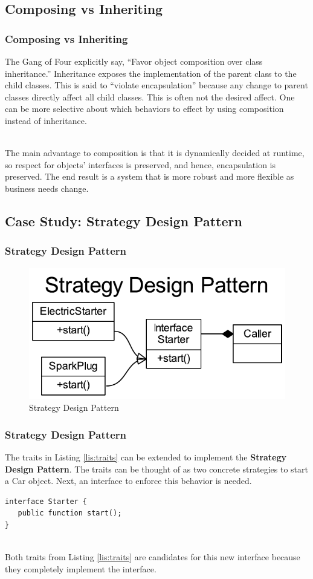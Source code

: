 \documentclass[aspectratio=169]{beamer}
\begin{document}
\subsection{Composing vs Inheriting}
\begin{frame}
\frametitle{Composing vs Inheriting}
The Gang of Four explicitly say, ``Favor object composition over class inheritance.'' \cite{gangoffour} Inheritance exposes the implementation of the parent class to the child classes. This is said to ``violate encapsulation'' because any change to parent classes directly affect all child classes. This is often not the desired affect. One can be more selective about which behaviors to effect by using composition instead of inheritance.

\mbox{}\\
The main advantage to composition is that it is dynamically decided at runtime, so respect for objects' interfaces is preserved, and hence, encapsulation is preserved. The end result is a system that is more robust and more flexible as business needs change.
\end{frame}

\subsection{Case Study: Strategy Design Pattern}
\begin{frame}
\frametitle{Strategy Design Pattern}
\begin{figure}
\includegraphics{../artifacts/strategy.pdf}
\caption{Strategy Design Pattern}
\label{fig:strategy}
\end{figure}
\end{frame}

\begin{frame}[fragile]
\frametitle{Strategy Design Pattern}
The traits in Listing \ref{lis:traits} can be extended to implement the \textbf{Strategy Design Pattern}. The traits can be thought of as two concrete strategies to start a Car object. Next, an interface to enforce this behavior is needed.
\begin{lstlisting}[caption=Building Out the Strategy Pattern: the Interface,label=lis:start-interface]
interface Starter {
   public function start();
}
\end{lstlisting}

\mbox{}\\
Both traits from Listing \ref{lis:traits} are candidates for this new interface because they completely implement the interface.
\end{frame}
\end{document}
